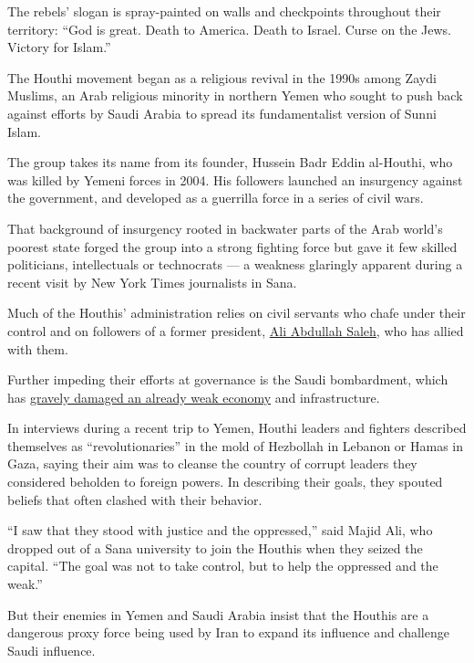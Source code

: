 The rebels' slogan is spray-painted on walls and checkpoints throughout
their territory: ``God is great. Death to America. Death to Israel.
Curse on the Jews. Victory for Islam.''

The Houthi movement began as a religious revival in the 1990s among
Zaydi Muslims, an Arab religious minority in northern Yemen who sought
to push back against efforts by Saudi Arabia to spread its
fundamentalist version of Sunni Islam.

The group takes its name from its founder, Hussein Badr Eddin al-Houthi,
who was killed by Yemeni forces in 2004. His followers launched an
insurgency against the government, and developed as a guerrilla force in
a series of civil wars.

That background of insurgency rooted in backwater parts of the Arab
world's poorest state forged the group into a strong fighting force but
gave it few skilled politicians, intellectuals or technocrats --- a
weakness glaringly apparent during a recent visit by New York Times
journalists in Sana.

Much of the Houthis' administration relies on civil servants who chafe
under their control and on followers of a former president,
\href{http://www.nytimes3xbfgragh.onion/2014/02/01/world/middleeast/even-out-of-office-a-wielder-of-great-power-in-yemen.html}{Ali
Abdullah Saleh}, who has allied with them.

Further impeding their efforts at governance is the Saudi bombardment,
which has
\href{http://www.nytimes3xbfgragh.onion/2016/11/14/world/middleeast/yemen-saudi-bombing-houthis-hunger.html}{gravely
damaged an already weak economy} and infrastructure.

In interviews during a recent trip to Yemen, Houthi leaders and fighters
described themselves as ``revolutionaries'' in the mold of Hezbollah in
Lebanon or Hamas in Gaza, saying their aim was to cleanse the country of
corrupt leaders they considered beholden to foreign powers. In
describing their goals, they spouted beliefs that often clashed with
their behavior.

``I saw that they stood with justice and the oppressed,'' said Majid
Ali, who dropped out of a Sana university to join the Houthis when they
seized the capital. ``The goal was not to take control, but to help the
oppressed and the weak.''

But their enemies in Yemen and Saudi Arabia insist that the Houthis are
a dangerous proxy force being used by Iran to expand its influence and
challenge Saudi influence.

